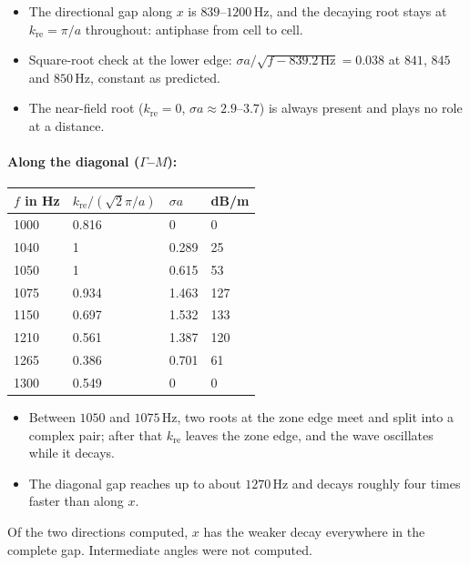\begin{itemize}
  \item The directional gap along $x$ is $839$--$1200\,\mathrm{Hz}$, and the decaying
        root stays at $k_\mathrm{re} = \pi/a$ throughout: antiphase from cell to cell.
  \item Square-root check at the lower edge: $\sigma a/\sqrt{f - 839.2\,\mathrm{Hz}} =
        0.038$ at $841$, $845$ and $850\,\mathrm{Hz}$, constant as predicted.
  \item The near-field root ($k_\mathrm{re} = 0$, $\sigma a \approx 2.9$--$3.7$) is
        always present and plays no role at a distance.
\end{itemize}

\paragraph{Along the diagonal ($\Gamma$--$M$):}

\begin{center}
\begin{tabular}{|l|l|l|l|}
\hline
$f$ in Hz & $k_\mathrm{re}/(\sqrt{2}\pi/a)$ & $\sigma a$ & dB/m \\
\hline
1000 & 0.816 & 0 & 0 \\
1040 & 1 & 0.289 & 25 \\
1050 & 1 & 0.615 & 53 \\
1075 & 0.934 & 1.463 & 127 \\
1150 & 0.697 & 1.532 & 133 \\
1210 & 0.561 & 1.387 & 120 \\
1265 & 0.386 & 0.701 & 61 \\
1300 & 0.549 & 0 & 0 \\
\hline
\end{tabular}
\end{center}

\begin{itemize}
  \item Between $1050$ and $1075\,\mathrm{Hz}$, two roots at the zone edge meet and
        split into a complex pair; after that $k_\mathrm{re}$ leaves the zone edge, and
        the wave oscillates while it decays.
  \item The diagonal gap reaches up to about $1270\,\mathrm{Hz}$ and decays roughly
        four times faster than along $x$.
\end{itemize}

Of the two directions computed, $x$ has the weaker decay everywhere in the complete
gap. Intermediate angles were not computed.


